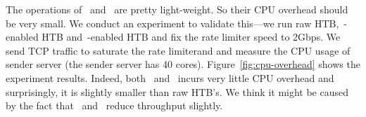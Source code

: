 The operations of~\dem{} and~\spring{} are pretty light-weight. 
So their CPU overhead should be very small. We conduct an experiment to 
validate this---we run raw HTB,~\dem{}-enabled HTB and~\spring{}-enabled HTB and 
fix the rate limiter speed to 2Gbps. We send TCP traffic to saturate the rate limiterand and 
measure the CPU usage of sender server (the sender server has 40 cores). 
Figure~\ref{fig:cpu-overhead} shows the experiment results. 
Indeed, both~\dem{} and~\spring{} incurs very little CPU overhead and surprisingly, 
it is slightly smaller than raw HTB's. 
We think it might be caused by the fact 
that~\dem{} and~\spring{} reduce throughput slightly. 

